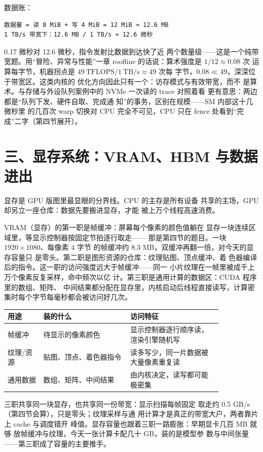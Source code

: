 数据账：

\begin{lstlisting}
数据量 = 读 8 MiB + 写 4 MiB = 12 MiB ≈ 12.6 MB
1 TB/s 带宽下：12.6 MB / 1 TB/s ≈ 12.6 微秒
\end{lstlisting}

0.17 微秒对 12.6 微秒，指令发射比数据到达快了近
两个数量级——这是一个纯带宽题。用“冒险、异常与性能”一章
roofline 的话说：算术强度是 $1/12\approx0.08$ 次
运算每字节，机器拐点是
$49\ \text{TFLOPS}/1\ \text{TB/s}\approx49$ 次每
字节，$0.08\ll49$，深深位于带宽区。这类内核的
优化方向因此只有一个：访存模式与有效带宽，而不
是算术。与存储与外设队列案例中的 NVMe 一次读的 trace 对照着看
更有意思：两边都是“队列下发、硬件自取、完成通
知”的事务，区别在规模——SM 内部这十几微秒里
的几百次 warp 切换对 CPU 完全不可见，CPU 只在
fence 处看到“完成”二字（第四节展开）。

\section{三、显存系统：VRAM、HBM 与数据进出}

显存是 GPU 版图里最显眼的分界线。CPU 的主存是所有设备
共享的主场，GPU 却另立一座仓库：数据先要搬进显存，才能
被上万个线程高速消费。

VRAM（显存）的第一职是帧缓冲：屏幕每个像素的颜色值躺在
显存一块连续区域里，等显示控制器按固定节拍逐行取走——
那是第四节的题目。一块 $1920\times1080$、每像素 4 字节
的帧缓冲约 8.3 MB，双缓冲再翻一倍，对今天的显存容量只
是零头。第二职是图形资源的仓库：纹理贴图、顶点缓冲、着
色器编译后的指令。这一职的访问强度远大于帧缓冲——同一
小片纹理在一帧里被成千上万个像素反复采样，命中频次以亿
计。第三职是通用计算的数据区：CUDA 程序里的数组、矩阵、
中间结果都分配在显存里，内核启动后线程直接读写，计算密
集时每个字节每毫秒都会被访问好几次。

\begin{longtable}{L{0.14\linewidth}L{0.34\linewidth}L{0.36\linewidth}}
\toprule
用途 & 装的什么 & 访问特征 \\
\midrule
帧缓冲 & 待显示的像素颜色 & 显示控制器逐行顺序读，渲染引擎随机写 \\\tablerowrule
纹理/资源 & 贴图、顶点、着色器指令 & 读多写少，同一片数据被大量像素重复读 \\\tablerowrule
通用数据 & 数组、矩阵、中间结果 & 由内核决定，读写都可能极密集 \\
\bottomrule
\end{longtable}

三职共享同一块显存，也共享同一份带宽：显示扫描每帧固定
取走约 0.5 GB/s（第四节会算），只是零头；纹理采样与通
用计算才是真正的带宽大户，两者靠片上 cache 与调度错开
峰值。显存容量也跟着三职一路膨胀：早期显卡几百 MB 就够
放帧缓冲与纹理，今天一张计算卡配几十 GB，装的是模型参
数与中间张量——第三职成了容量的主要推手。

